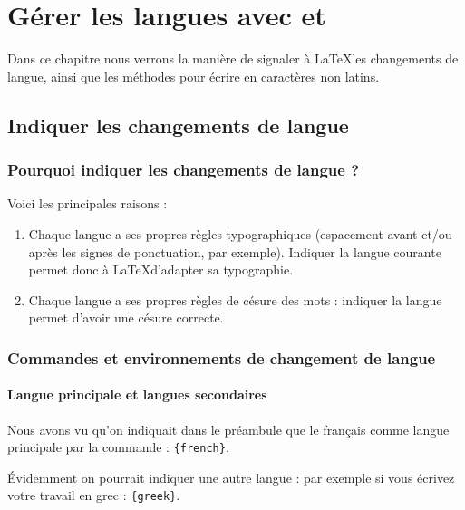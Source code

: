 \chapter{Gérer les langues avec  et }\label{i18n}

\begin{prealable}
    Dans ce chapitre nous verrons la manière de signaler à \LaTeX les changements de langue, ainsi que les méthodes pour écrire en caractères non latins.
\end{prealable}

\section{Indiquer les changements de langue}

\subsection{Pourquoi indiquer les changements de langue ?}

Voici les principales raisons :
\begin{enumerate}
\item Chaque langue  a ses propres règles typographiques (espacement avant et/ou après les signes de ponctuation, par exemple). Indiquer la langue courante permet donc à \LaTeX d'adapter sa typographie.
\item Chaque langue a ses propres règles de césure des mots : indiquer la langue permet d'avoir une césure correcte.
\end{enumerate}


\subsection{Commandes et environnements de changement de langue}

\subsubsection{Langue principale et langues secondaires}

Nous avons vu qu'on indiquait dans le préambule que le français comme langue principale par la commande : \verb|{french}|.




Évidemment on pourrait indiquer une autre langue :  par exemple si vous écrivez votre travail en grec :
\verb|{greek}|.


